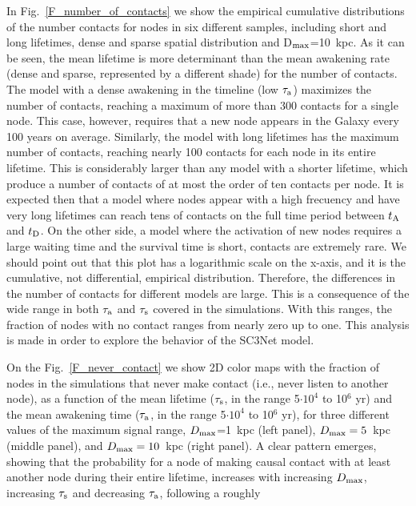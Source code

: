 \documentclass[crop]{CSLB}
\newcommand{\ceti}{node}
\newcommand{\cetis}{nodes}
\newcommand{\ffn}[1]{}
\begin{document}
\ffn{3}
%
In Fig.~\ref{F_number_of_contacts} we show the empirical cumulative
distributions of the number contacts for \cetis{} in six different
samples, including short and long lifetimes, dense and sparse spatial
distribution and D$_{\rm max}$=10~kpc.
%
As it can be seen, the mean lifetime is more determinant than the mean
awakening rate (dense and sparse, represented by a different shade)
for the number of contacts.
%
The model with a dense awakening in the timeline (low $\tau_{\rm a}$)
maximizes the number of contacts, reaching a maximum of more than 300
contacts for a single \ceti{}.
%
This case, however, requires that a new node appears in the Galaxy
every 100 years on average.
%
Similarly, the model with long lifetimes has the maximum number of
contacts, reaching nearly 100 contacts for each \ceti{} in its entire
lifetime.
%
This is considerably larger than any model with a shorter lifetime,
which produce a number of contacts of at most the order of ten
contacts per \ceti{}.
%
It is expected then that a model where nodes appear with a high
frecuency and have very long lifetimes can reach tens of contacts on
the full time period between $t_{\rm A}$ and $t_{\rm D}$.
%
On the other side, a model where the activation of new nodes requires
a large waiting time and the survival time is short, contacts are
extremely rare.
%
We should point out that this plot has a logarithmic scale on the
x-axis, and it is the cumulative, not differential, empirical
distribution.
%
Therefore, the differences in the number of contacts for different
models are large.
%
This is a consequence of the wide range in both $\tau_{\rm a}$ and
$\tau_{\rm s}$ covered in the simulations.
%
With this ranges, the fraction of \cetis{} with no contact ranges from
nearly zero up to one.
%
This analysis is made in order to explore the behavior of the SC3Net
model.
%
\ffn{4}
%
On the Fig.~\ref{F_never_contact} we show 2D color maps with the
fraction of \cetis{} in the simulations that never make contact (i.e.,
never listen to another \ceti{}), as a function of the mean lifetime
($\tau_{\rm s}$, in the range 5$\cdot 10^4$ to 10$^6$ yr) and the mean
awakening time ($\tau_{\rm a}$, in the range 5$\cdot 10^4$ to 10$^6$
yr), for three different values of the maximum signal range, $D_{\rm
max}$=1~kpc (left panel), $D_{\rm max}=5$~kpc (middle panel), and
$D_{\rm max}=10$~kpc (right panel).
%
A clear pattern emerges, showing that the probability for a \ceti{} of
making causal contact with at least another \ceti{} during their
entire lifetime, increases with increasing $D_{\rm max}$, increasing
$\tau_{\rm s}$ and decreasing $\tau_{\rm a}$, following a roughly
\end{document}
